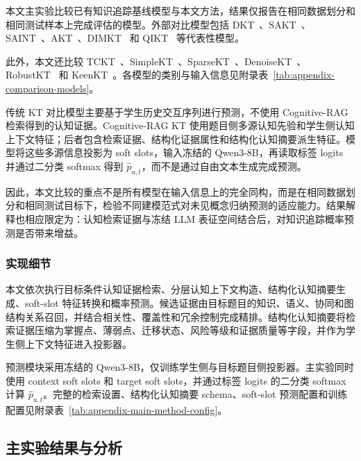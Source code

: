 \documentclass[UTF8,a4paper,12pt]{ctexart}
\numberwithin{table}{section}
\begin{document}
本文主实验比较已有知识追踪基线模型与本文方法，结果仅报告在相同数据划分和相同测试样本上完成评估的模型。外部对比模型包括 DKT~\citep{piech2015deep}、SAKT~\citep{pandey2019sakt}、SAINT~\citep{choi2020saint}、AKT~\citep{ghosh2020akt}、DIMKT~\citep{shen2022dimkt} 和 QIKT~\citep{chen2023qikt} 等代表性模型。

此外，本文还比较 TCKT~\citep{huang2024tckt}、SimpleKT~\citep{liu2023simplekt}、SparseKT~\citep{huang2023sparsekt}、DenoiseKT~\citep{deng2025denoisekt}、RobustKT~\citep{guo2025robustkt} 和 KeenKT~\citep{li2026keenkt}。各模型的类别与输入信息见附录表~\ref{tab:appendix-comparison-models}。

传统 KT 对比模型主要基于学生历史交互序列进行预测，不使用 Cognitive-RAG 检索得到的认知证据。Cognitive-RAG KT 使用题目侧多源认知先验和学生侧认知上下文特征；后者包含检索证据、结构化证据属性和结构化认知摘要派生特征。模型将这些多源信息投影为 soft slots，输入冻结的 Qwen3-8B\citep{yang2025qwen3,qwen2025qwen38b}，再读取标签 logits 并通过二分类 softmax 得到 \(\hat{p}_{u,t}\)，而不是通过自由文本生成完成预测。

因此，本文比较的重点不是所有模型在输入信息上的完全同构，而是在相同数据划分和相同测试目标下，检验不同建模范式对未见概念归纳预测的适应能力。结果解释也相应限定为：认知检索证据与冻结 LLM 表征空间结合后，对知识追踪概率预测是否带来增益。

\subsubsection{实现细节}

本文依次执行目标条件认知证据检索、分层认知上下文构造、结构化认知摘要生成、soft-slot 特征转换和概率预测。候选证据由目标题目的知识、语义、协同和图结构关系召回，并结合相关性、覆盖性和冗余控制完成精排。结构化认知摘要将检索证据压缩为掌握点、薄弱点、迁移状态、风险等级和证据质量等字段，并作为学生侧上下文特征进入投影器。

预测模块采用冻结的 Qwen3-8B，仅训练学生侧与目标题目侧投影器。主实验同时使用 context soft slots 和 target soft slots，并通过标签 logits 的二分类 softmax 计算 \(\hat{p}_{u,t}\)\citep{yang2025qwen3,qwen2025qwen38b,qwen2025qwen3embedding,qwen2025qwen3reranker}。完整的检索设置、结构化认知摘要 schema、soft-slot 预测配置和训练配置见附录表~\ref{tab:appendix-main-method-config}。

\subsection{主实验结果与分析}
\end{document}
